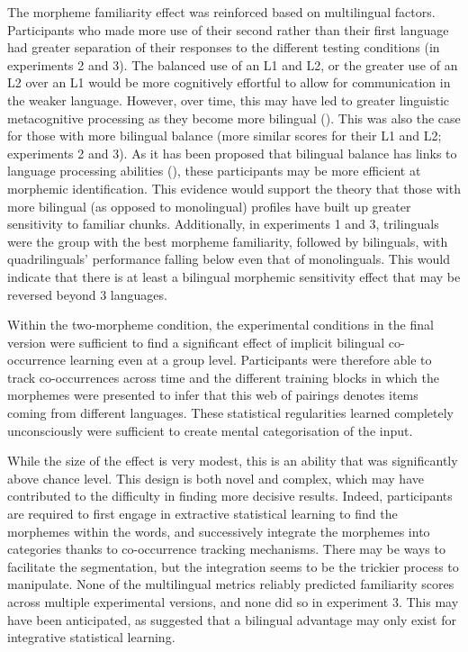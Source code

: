 The morpheme familiarity effect was reinforced based on multilingual factors. Participants who made more use of their second rather than their first language had greater separation of their responses to the different testing  conditions (in experiments 2 and 3). The balanced use of an L1 and L2, or the greater use of an L2 over an L1 would be more cognitively effortful to allow for communication in the weaker language. However, over time, this may have led to greater linguistic metacognitive processing as they become more bilingual (\cite{Ordin2020}). This was also the case for those with more bilingual balance (more similar scores for their L1 and L2; experiments 2 and 3). As it has been proposed that bilingual balance has links to language processing abilities (\cite{Birdsong2016}), these participants may be more efficient at morphemic identification. This evidence would support the theory that those with more bilingual (as opposed to monolingual) profiles have built up greater sensitivity to familiar chunks. Additionally, in experiments 1 and 3, trilinguals were the group with the best morpheme familiarity, followed by bilinguals, with quadrilinguals' performance falling below even that of monolinguals. This would indicate that there is at least a bilingual morphemic sensitivity effect that may be reversed beyond 3 languages.

Within the two-morpheme condition, the experimental conditions in the final version were sufficient to find a significant effect of implicit bilingual co-occurrence learning even at a group level. Participants were therefore able to track co-occurrences across time and the different training blocks in which the morphemes were presented to infer that this web of pairings denotes items coming from different languages. These statistical regularities learned completely unconsciously were sufficient to create mental categorisation of the input. 

While the size of the effect is very modest, this is an ability that was significantly above chance level. This design is both novel and complex, which may have contributed to the difficulty in finding more decisive results. Indeed, participants are required to first engage in extractive statistical learning to find the morphemes within the words, and successively integrate the morphemes into categories thanks to co-occurrence tracking mechanisms. There may be ways to facilitate the segmentation, but the integration seems to be the trickier process to manipulate. None of the multilingual metrics reliably predicted familiarity scores across multiple experimental versions, and none did so in experiment 3. This may have been anticipated, as \textcite{Poepsel2016} suggested that a bilingual advantage may only exist for integrative statistical learning.

